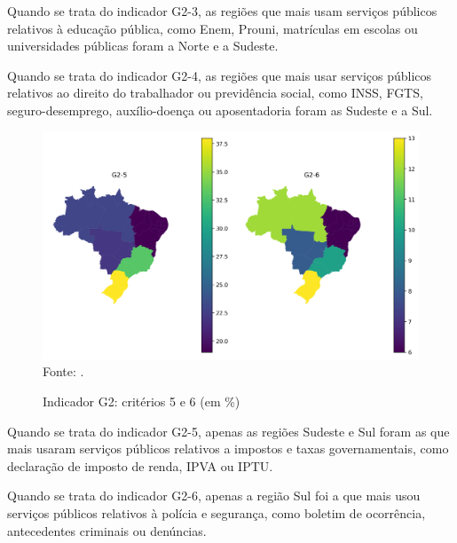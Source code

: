 Quando se trata do indicador G2-3, as regiões que mais usam serviços públicos relativos à educação pública, como Enem, Prouni, matrículas em escolas ou universidades públicas foram a Norte e a Sudeste.

Quando se trata do indicador G2-4, as regiões que mais usar serviços públicos relativos ao direito do trabalhador ou previdência social, como INSS, FGTS, seguro-desemprego, auxílio-doença ou aposentadoria foram as Sudeste e a Sul.

\begin{figure}[H]
	\centering
	\caption{Indicador G2: critérios 5 e 6 (em \%)}
	\includegraphics[width=1\linewidth]{figuras/mapa_coropletico_tic_domicilios_2024_g2_5_6.png}
	\label{fig:mapa_coropletico_tic_domicilios_2024_g2_5_6}
	\footnotesize{Fonte: \cite{tic_domicilios_2024_g2}.}
\end{figure}

Quando se trata do indicador G2-5, apenas as regiões Sudeste e Sul foram as que mais usaram serviços públicos relativos a impostos e taxas governamentais, como declaração de imposto de renda, IPVA ou IPTU.

Quando se trata do indicador G2-6, apenas a região Sul foi a que mais usou serviços públicos relativos à polícia e segurança, como boletim de ocorrência, antecedentes criminais ou denúncias.

